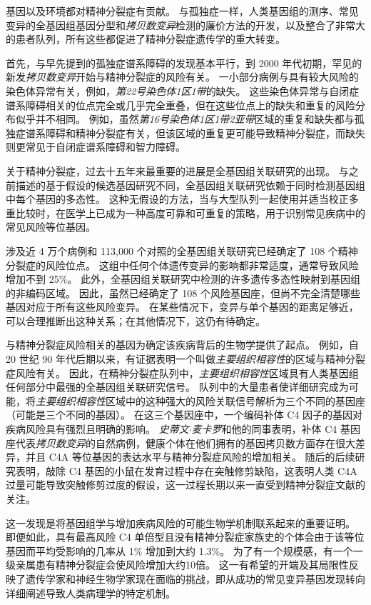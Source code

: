 基因以及环境都对精神分裂症有贡献。
与孤独症一样，人类基因组的测序、常见变异的全基因组基因分型和\textit{拷贝数变异}检测的廉价方法的开发，以及整合了非常大的患者队列，所有这些都促进了精神分裂症遗传学的重大转变。

首先，与早先提到的孤独症谱系障碍的发现基本平行，到 2000 年代初期，罕见的新发\textit{拷贝数变异}开始与精神分裂症的风险有关。
一小部分病例与具有较大风险的染色体异常有关，例如，\textit{第22号染色体1区1带}的缺失。
这些染色体异常与自闭症谱系障碍相关的位点完全或几乎完全重叠，但在这些位点上的缺失和重复的风险分布似乎并不相同。
例如，虽然\textit{第16号染色体1区1带2亚带}区域的重复和缺失都与孤独症谱系障碍和精神分裂症有关，但该区域的重复更可能导致精神分裂症，而缺失则更常见于自闭症谱系障碍和智力障碍。


关于精神分裂症，过去十五年来最重要的进展是全基因组关联研究的出现。
与之前描述的基于假设的候选基因研究不同，全基因组关联研究依赖于同时检测基因组中每个基因的多态性。
这种无假设的方法，当与大型队列一起使用并适当校正多重比较时，在医学上已成为一种高度可靠和可重复的策略，用于识别常见疾病中的常见风险等位基因。


涉及近 4 万个病例和 113,000 个对照的全基因组关联研究已经确定了 108 个精神分裂症的风险位点。 
这组中任何个体遗传变异的影响都非常适度，通常导致风险增加不到 25\%。
此外，全基因组关联研究中检测的许多遗传多态性映射到基因组的非编码区域。
因此，虽然已经确定了 108 个风险基因座，但尚不完全清楚哪些基因对应于所有这些风险变异。
在某些情况下，变异与单个基因的距离足够近，可以合理推断出这种关系；在其他情况下，这仍有待确定。


与精神分裂症风险相关的基因为确定该疾病背后的生物学提供了起点。
例如，自 20 世纪 90 年代后期以来，有证据表明一个叫做\textit{主要组织相容性}的区域与精神分裂症风险有关。
因此，在精神分裂症队列中，\textit{主要组织相容性}区域具有人类基因组任何部分中最强的全基因组关联研究信号。
队列中的大量患者使详细研究成为可能，将\textit{主要组织相容性}区域中的这种强大的风险关联信号解析为三个不同的基因座（可能是三个不同的基因）。
在这三个基因座中，一个编码补体 C4 因子的基因对疾病风险具有强烈且明确的影响。
\textit{史蒂文$\cdot$麦卡罗}和他的同事表明，补体 C4 基因座代表\textit{拷贝数变异}的自然病例，健康个体在他们拥有的基因拷贝数方面存在很大差异，并且 C4A 等位基因的表达水平与精神分裂症风险的增加相关。
随后的后续研究表明，敲除 C4 基因的小鼠在发育过程中存在突触修剪缺陷，这表明人类 C4A 过量可能导致突触修剪过度的假设，这一过程长期以来一直受到精神分裂症文献的关注。

这一发现是将基因组学与增加疾病风险的可能生物学机制联系起来的重要证明。
即便如此，具有最高风险 C4 单倍型且没有精神分裂症家族史的个体会由于该等位基因而平均受影响的几率从 1\% 增加到大约 1.3\%。
为了有一个规模感，有一个一级亲属患有精神分裂症会使风险增加大约10倍。
这一有希望的开端及其局限性反映了遗传学家和神经生物学家现在面临的挑战，即从成功的常见变异基因发现转向详细阐述导致人类病理学的特定机制。


